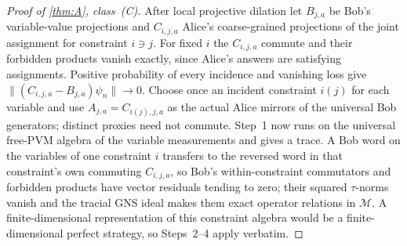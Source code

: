 \begin{proof}[Proof of \cref{thm:A}, class~(C)]
After local projective dilation let $B_{j,a}$ be Bob's variable-value projections and $C_{i,j,a}$ Alice's coarse-grained
projections of the joint assignment for constraint $i\ni j$. For fixed $i$ the $C_{i,j,a}$ commute and their forbidden
products vanish exactly, since Alice's answers are satisfying assignments. Positive probability of every incidence and
vanishing loss give $\|(C_{i,j,a}-B_{j,a})\psi_n\|\to0$. Choose once an incident constraint $i(j)$ for each variable and use
$A_{j,a}=C_{i(j),j,a}$ as the actual Alice mirrors of the universal Bob generators; distinct proxies need not commute.
Step~1 now runs on the universal free-PVM algebra of the variable measurements and gives a trace. A Bob word on the
variables of one constraint $i$ transfers to the reversed word in that constraint's own commuting $C_{i,j,a}$, so Bob's
within-constraint commutators and forbidden products have vector residuals tending to zero; their squared $\tau$-norms
vanish and the tracial GNS ideal makes them exact operator relations in $\mathcal M$. A finite-dimensional
representation of this constraint algebra would be a finite-dimensional perfect strategy, so Steps~2--4 apply verbatim.
\end{proof}

